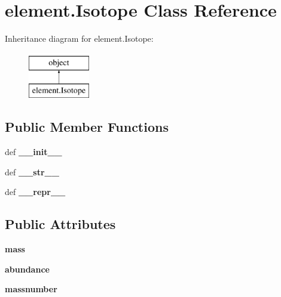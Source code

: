 \hypertarget{classelement_1_1Isotope}{\section{element.\+Isotope Class Reference}
\label{classelement_1_1Isotope}
}
Inheritance diagram for element.\+Isotope\+:\begin{figure}[H]
\begin{center}
\leavevmode
\includegraphics[height=2.000000cm]{classelement_1_1Isotope}
\end{center}
\end{figure}
\subsection*{Public Member Functions}
\begin{DoxyCompactItemize}
\item 
\hypertarget{classelement_1_1Isotope_abf01a2a4f218cba0e54533d7240778f3}{def {\bfseries \+\_\+\+\_\+init\+\_\+\+\_\+}}\label{classelement_1_1Isotope_abf01a2a4f218cba0e54533d7240778f3}

\item 
\hypertarget{classelement_1_1Isotope_a361f52e572b72eac4262e9de6609cfb2}{def {\bfseries \+\_\+\+\_\+str\+\_\+\+\_\+}}\label{classelement_1_1Isotope_a361f52e572b72eac4262e9de6609cfb2}

\item 
\hypertarget{classelement_1_1Isotope_a7528e92c63317a8a8c5674c2db36966b}{def {\bfseries \+\_\+\+\_\+repr\+\_\+\+\_\+}}\label{classelement_1_1Isotope_a7528e92c63317a8a8c5674c2db36966b}

\end{DoxyCompactItemize}
\subsection*{Public Attributes}
\begin{DoxyCompactItemize}
\item 
\hypertarget{classelement_1_1Isotope_a2e31ac3e98b35a5397b6b8436616a508}{{\bfseries mass}}\label{classelement_1_1Isotope_a2e31ac3e98b35a5397b6b8436616a508}

\item 
\hypertarget{classelement_1_1Isotope_ab8adfe46b387505f9dd6531aba9d7bb1}{{\bfseries abundance}}\label{classelement_1_1Isotope_ab8adfe46b387505f9dd6531aba9d7bb1}

\item 
\hypertarget{classelement_1_1Isotope_ae91f09ed3099994069bae0718618e027}{{\bfseries massnumber}}\label{classelement_1_1Isotope_ae91f09ed3099994069bae0718618e027}

\end{DoxyCompactItemize}


